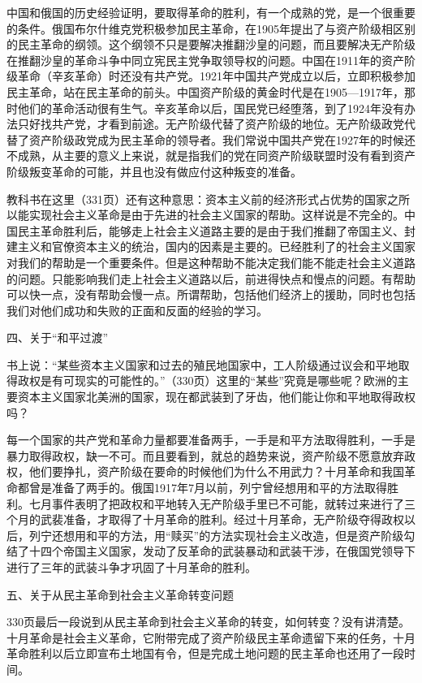中国和俄国的历史经验证明，要取得革命的胜利，有一个成熟的党，是一个很重要的条件。俄国布尔什维克党积极参加民主革命，在1905年提出了与资产阶级相区别的民主革命的纲领。这个纲领不只是要解决推翻沙皇的问题，而且要解决无产阶级在推翻沙皇的革命斗争中同立宪民主党争取领导权的问题。中国在1911年的资产阶级革命（辛亥革命）时还没有共产党。1921年中国共产党成立以后，立即积极参加民主革命，站在民主革命的前头。中国资产阶级的黄金时代是在1905—1917年，那时他们的革命活动很有生气。辛亥革命以后，国民党已经堕落，到了1924年没有办法只好找共产党，才看到前途。无产阶级代替了资产阶级的地位。无产阶级政党代替了资产阶级政党成为民主革命的领导者。我们常说中国共产党在1927年的时候还不成熟，从主要的意义上来说，就是指我们的党在同资产阶级联盟时没有看到资产阶级叛变革命的可能，并且也没有做应付这种叛变的准备。

教科书在这里（331页）还有这种意思：资本主义前的经济形式占优势的国家之所以能实现社会主义革命是由于先进的社会主义国家的帮助。这样说是不完全的。中国民主革命胜利后，能够走上社会主义道路主要的是由于我们推翻了帝国主义、封建主义和官僚资本主义的统治，国内的因素是主要的。已经胜利了的社会主义国家对我们的帮助是一个重要条件。但是这种帮助不能决定我们能不能走社会主义道路的问题。只能影响我们走上社会主义道路以后，前进得快点和慢点的问题。有帮助可以快一点，没有帮助会慢一点。所谓帮助，包括他们经济上的援助，同时也包括我们对他们成功和失败的正面和反面的经验的学习。

四、关于“和平过渡”

书上说：“某些资本主义国家和过去的殖民地国家中，工人阶级通过议会和平地取得政权是有可现实的可能性的。”（330页）这里的“某些”究竟是哪些呢？欧洲的主要资本主义国家北美洲的国家，现在都武装到了牙齿，他们能让你和平地取得政权吗？

每一个国家的共产党和革命力量都要准备两手，一手是和平方法取得胜利，一手是暴力取得政权，缺一不可。而且要看到，就总的趋势来说，资产阶级不愿意放弃政权，他们要挣扎，资产阶级在要命的时候他们为什么不用武力？十月革命和我国革命都曾是准备了两手的。俄国1917年7月以前，列宁曾经想用和平的方法取得胜利。七月事件表明了把政权和平地转入无产阶级手里已不可能，就转过来进行了三个月的武裴准备，才取得了十月革命的胜利。经过十月革命，无产阶级夺得政权以后，列宁还想用和平的方法，用“赎买”的方法实现社会主义改造，但是资产阶级勾结了十四个帝国主义国家，发动了反革命的武装暴动和武装干涉，在俄国党领导下进行了三年的武装斗争才巩固了十月革命的胜利。

五、关于从民主革命到社会主义革命转变问题

330页最后一段说到从民主革命到社会主义革命的转变，如何转变？没有讲清楚。十月革命是社会主义革命，它附带完成了资产阶级民主革命遗留下来的任务，十月革命胜利以后立即宣布土地国有令，但是完成土地问题的民主革命也还用了一段时间。

